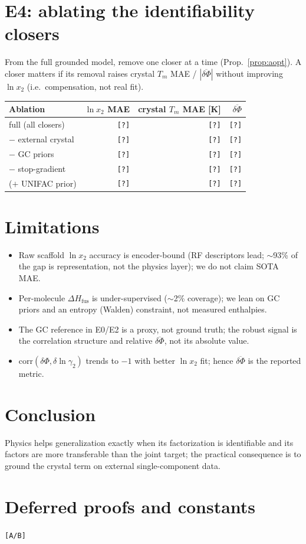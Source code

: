 \documentclass[11pt]{article}
\newcommand{\pending}[1][?]{{\color{red}\texttt{[#1]}}}
\newcommand{\lnx}{\ln x_2}
\newcommand{\Phicry}{\Phi}
\newcommand{\dHfus}{\Delta H_{\mathrm{fus}}}
\newcommand{\Tm}{T_m}
\newcommand{\lng}{\ln\gamma_2}
\begin{document}
\section{E4: ablating the identifiability closers}
\label{sec:e4}
From the full grounded model, remove one closer at a time
(Prop.~\ref{prop:aopt}). A closer matters if its removal raises crystal $\Tm$ MAE
/ $|\overline{\delta\Phicry}|$ without improving $\lnx$ (i.e.\ compensation, not
real fit).
\begin{center}
\begin{tabular}{lrrr}
\toprule
Ablation & $\lnx$ MAE & crystal $\Tm$ MAE [K] & $\overline{\delta\Phicry}$ \\
\midrule
full (all closers)     & \pending & \pending & \pending \\
$-$ external crystal    & \pending & \pending & \pending \\
$-$ GC priors           & \pending & \pending & \pending \\
$-$ stop-gradient       & \pending & \pending & \pending \\
($+$ UNIFAC prior)      & \pending & \pending & \pending \\
\bottomrule
\end{tabular}
\end{center}

\section{Limitations}
\label{sec:limits}
\begin{itemize}
  \item Raw scaffold $\lnx$ accuracy is encoder-bound (RF descriptors lead;
  $\sim$93\% of the gap is representation, not the physics layer); we do not
  claim SOTA MAE.
  \item Per-molecule $\dHfus$ is under-supervised ($\sim$2\% coverage); we lean on
  GC priors and an entropy (Walden) constraint, not measured enthalpies.
  \item The GC reference in E0/E2 is a proxy, not ground truth; the robust signal
  is the correlation structure and relative $\overline{\delta\Phicry}$, not its
  absolute value.
  \item $\mathrm{corr}(\delta\Phicry,\delta\lng)$ trends to $-1$ with better
  $\lnx$ fit; hence $\overline{\delta\Phicry}$ is the reported metric.
\end{itemize}

\section{Conclusion}
\label{sec:conclusion}
Physics helps generalization exactly when its factorization is identifiable and
its factors are more transferable than the joint target; the practical
consequence is to ground the crystal term on external single-component data.

\appendix
\section{Deferred proofs and constants}\pending[A/B]
\end{document}
